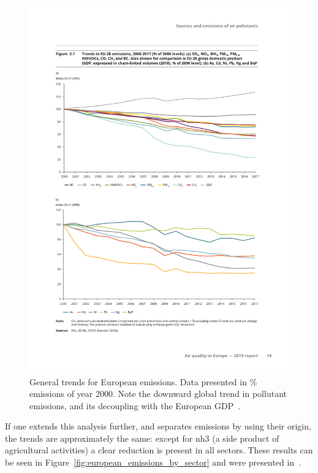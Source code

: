 \begin{figure}[htpb]
    \centering
    \includegraphics[clip,%
        trim=0cm 15cm 0cm 5.8cm,%
        width=\textwidth]{img/pdf/european_emission_trends.pdf}
    \caption{General trends for European emissions. Data presented in \%
    emissions of year 2000. Note the downward global trend in pollutant
    emissions, and its decoupling with the European GDP~\cite{EEA2019}.}
    \label{fig:european_emission_trends}
\end{figure}

If one extends this analysis further, and separates emissions by using
their origin, the trends are approximately the same: except for
\gls{nh3} (a side product of agricultural activities) a clear reduction
is present in all sectors. These results can be seen in
Figure~\ref{fig:european_emissions_by_sector} and were presented
in~\cite{EEA2019}.

